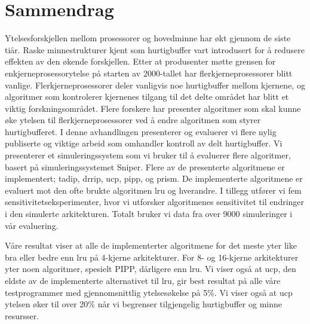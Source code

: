 \section*{Sammendrag}
Ytelsesforskjellen mellom prosessorer og hovedminne har økt gjennom de siste tiår.
Raske minnestrukturer kjent som hurtigbuffer vart introdusert for å redusere effekten av den økende forskjellen.
Etter at produsenter møtte grensen for enkjerneprosessorytelse på starten av 2000-tallet har flerkjerneprosessorer blitt vanlige.
Flerkjerneprosessorer deler vanligvis noe hurtigbuffer mellom kjernene, og algoritmer som kontrolerer kjernenes tilgang til det delte området har blitt et viktig forskningsområdet.
Flere forskere har presenter algoritmer som skal kunne øke ytelsen til flerkjerneprosessorer ved å endre algoritmen som styrer hurtigbufferet.
I denne avhandlingen presenterer og evaluerer vi flere nylig publiserte og viktige arbeid som omhandler kontroll av delt hurtigbuffer.
Vi presenterer et simuleringssystem som vi bruker til å evaluerer flere algoritmer, basert på simuleringssystemet Sniper.
Flere av de presenterte algoritmene er implementert; \gls{tadip}, \gls{drrip}, \gls{ucp}, \gls{pipp}, og \gls{prism}.
De implementerte algoritmene er evaluert mot den ofte brukte algoritmen \gls{lru} og hverandre.
I tillegg utfører vi fem sensitivitetseksperimenter, hvor vi utforsker algoritmenes sensitivitet til endringer i den simulerte arkitekturen.
Totalt bruker vi data fra over 9000 simuleringer i vår evaluering.

Våre resultat viser at alle de implementerter algoritmene for det meste yter like bra eller bedre enn \gls{lru} på 4-kjerne arkitekturer.
For 8- og 16-kjerne arkitekturer yter noen algoritmer, spesielt PIPP, dårligere enn \gls{lru}.
Vi viser også at \gls{ucp}, den eldste av de implementerte alternativet til \gls{lru}, gir best resultat på alle våre testprogrammer med gjennomsnittlig ytelsesøkelse på 5\%.
Vi viser også at \gls{ucp} ytelsen øker til over 20\% når vi begrenser tilgjengelig hurtigbuffer og minne resursser.

\clearpage